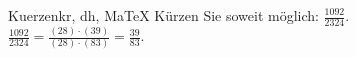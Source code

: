 \begin{MAufgabe}{Kuerzen}{kr, dh, MaTeX}
K\"urzen Sie soweit m\"oglich: $\frac{1092}{2324}$.\\ 
\ifLsg\MLoesung
\quad $\frac{1092}{2324}=\frac{(28)\cdot(39)}{(28)\cdot(83)}=\frac{39}{83}$.\else\relax\fi
 \end{MAufgabe}